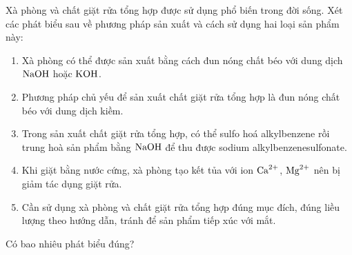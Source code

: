 \documentclass[11pt,a4paper]{article}
\begin{document}
\begin{ex}
Xà phòng và chất giặt rửa tổng hợp được sử dụng phổ biến trong đời sống. Xét các phát biểu sau về phương pháp sản xuất và cách sử dụng hai loại sản phẩm này:
\begin{enumerate}[label=\alph*),itemsep=1pt,leftmargin=1.5cm]
\item Xà phòng có thể được sản xuất bằng cách đun nóng chất béo với dung dịch $\ce{NaOH}$ hoặc $\ce{KOH}$.
\item Phương pháp chủ yếu để sản xuất chất giặt rửa tổng hợp là đun nóng chất béo với dung dịch kiềm.
\item Trong sản xuất chất giặt rửa tổng hợp, có thể sulfo hoá alkylbenzene rồi trung hoà sản phẩm bằng $\ce{NaOH}$ để thu được sodium alkylbenzenesulfonate.
\item Khi giặt bằng nước cứng, xà phòng tạo kết tủa với ion $\ce{Ca^2+}$, $\ce{Mg^2+}$ nên bị giảm tác dụng giặt rửa.
\item Cần sử dụng xà phòng và chất giặt rửa tổng hợp đúng mục đích, đúng liều lượng theo hướng dẫn, tránh để sản phẩm tiếp xúc với mắt.
\end{enumerate}
Có bao nhiêu phát biểu đúng?



\end{ex}
\end{document}
